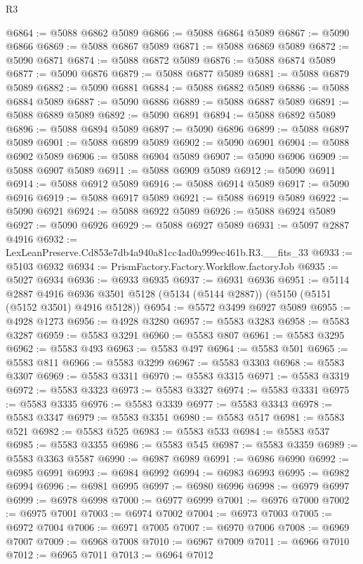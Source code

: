 \begin{lexlean}{R3}
\begin{coremodule}
@6864 := @5088 @6862 @5089
@6866 := @5088 @6864 @5089
@6867 := @5090 @6866
@6869 := @5088 @6867 @5089
@6871 := @5088 @6869 @5089
@6872 := @5090 @6871
@6874 := @5088 @6872 @5089
@6876 := @5088 @6874 @5089
@6877 := @5090 @6876
@6879 := @5088 @6877 @5089
@6881 := @5088 @6879 @5089
@6882 := @5090 @6881
@6884 := @5088 @6882 @5089
@6886 := @5088 @6884 @5089
@6887 := @5090 @6886
@6889 := @5088 @6887 @5089
@6891 := @5088 @6889 @5089
@6892 := @5090 @6891
@6894 := @5088 @6892 @5089
@6896 := @5088 @6894 @5089
@6897 := @5090 @6896
@6899 := @5088 @6897 @5089
@6901 := @5088 @6899 @5089
@6902 := @5090 @6901
@6904 := @5088 @6902 @5089
@6906 := @5088 @6904 @5089
@6907 := @5090 @6906
@6909 := @5088 @6907 @5089
@6911 := @5088 @6909 @5089
@6912 := @5090 @6911
@6914 := @5088 @6912 @5089
@6916 := @5088 @6914 @5089
@6917 := @5090 @6916
@6919 := @5088 @6917 @5089
@6921 := @5088 @6919 @5089
@6922 := @5090 @6921
@6924 := @5088 @6922 @5089
@6926 := @5088 @6924 @5089
@6927 := @5090 @6926
@6929 := @5088 @6927 @5089
@6931 := @5097 @2887 @4916
@6932 := LexLeanPreserve.Cd853e7db4a940a81cc4ad0a999ec461b.R3.__fits_33
@6933 := @5103 @6932
@6934 := PrismFactory.Factory.Workflow.factoryJob
@6935 := @5027 @6934
@6936 := @6933 @6935
@6937 := @6931 @6936
@6951 := @5114
    @2887
    @4916
    @6936
    @3501
    @5128
    (@5134 (@5144 @2887))
    (@5150 (@5151 (@5152 @3501) @4916 @5128))
@6954 := @5572 @3499 @6927 @5089
@6955 := @4928 @1273
@6956 := @4928 @3280
@6957 := @5583 @3283
@6958 := @5583 @3287
@6959 := @5583 @3291
@6960 := @5583 @807
@6961 := @5583 @3295
@6962 := @5583 @493
@6963 := @5583 @497
@6964 := @5583 @501
@6965 := @5583 @811
@6966 := @5583 @3299
@6967 := @5583 @3303
@6968 := @5583 @3307
@6969 := @5583 @3311
@6970 := @5583 @3315
@6971 := @5583 @3319
@6972 := @5583 @3323
@6973 := @5583 @3327
@6974 := @5583 @3331
@6975 := @5583 @3335
@6976 := @5583 @3339
@6977 := @5583 @3343
@6978 := @5583 @3347
@6979 := @5583 @3351
@6980 := @5583 @517
@6981 := @5583 @521
@6982 := @5583 @525
@6983 := @5583 @533
@6984 := @5583 @537
@6985 := @5583 @3355
@6986 := @5583 @545
@6987 := @5583 @3359
@6989 := @5583 @3363 @5587
@6990 := @6987 @6989
@6991 := @6986 @6990
@6992 := @6985 @6991
@6993 := @6984 @6992
@6994 := @6983 @6993
@6995 := @6982 @6994
@6996 := @6981 @6995
@6997 := @6980 @6996
@6998 := @6979 @6997
@6999 := @6978 @6998
@7000 := @6977 @6999
@7001 := @6976 @7000
@7002 := @6975 @7001
@7003 := @6974 @7002
@7004 := @6973 @7003
@7005 := @6972 @7004
@7006 := @6971 @7005
@7007 := @6970 @7006
@7008 := @6969 @7007
@7009 := @6968 @7008
@7010 := @6967 @7009
@7011 := @6966 @7010
@7012 := @6965 @7011
@7013 := @6964 @7012

\end{coremodule}
\end{lexlean}
